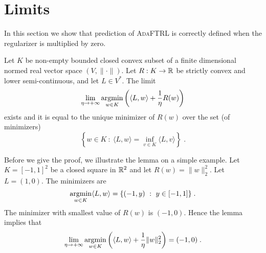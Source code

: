 \section{Limits}
\label{section:limits}

In this section we show that prediction of \textsc{AdaFTRL} is correctly
defined when the regularizer is multiplied by zero.

\begin{lemma}
\label{lemma:prediction-limit-existence}
Let $K$ be non-empty bounded closed convex subset of a finite dimensional
normed real vector space $(V, \|\cdot\|)$.  Let $R:K \to \mathbb{R}$ be strictly convex
and lower semi-continuous, and let $L \in V^*$. The limit
\begin{equation}
\label{equation:limit}
\lim_{\eta \to +\infty}
\operatorname*{argmin}_{w \in K} \left( \langle L, w \rangle + \frac{1}{\eta} R(w) \right)
\end{equation}
exists and it is equal to the unique minimizer of $R(w)$ over the set (of minimizers)
$$
\left\{ w \in K ~:~ \langle L, w \rangle = \inf_{v \in K} \langle L, v \rangle \right\} \; .
$$
\end{lemma}

Before we give the proof, we illustrate the lemma on a simple
example.  Let $K = [-1,1]^2$ be a closed square in $\mathbb{R}^2$ and let
$R(w) = \|w\|_2^2$. Let $L = (1,0)$. The minimizers are
$$
\operatorname*{argmin}_{w \in K} \langle L, w \rangle = \{ (-1,y) ~:~ y \in [-1,1] \} \; .
$$
The minimizer with smallest value of $R(w)$ is $(-1,0)$. Hence the lemma implies
that
$$
\lim_{\eta \to +\infty} \operatorname*{argmin}_{w \in K}
\left( \langle L, w \rangle + \frac{1}{\eta} \|w\|_2^2 \right) = (-1, 0) \; .
$$

